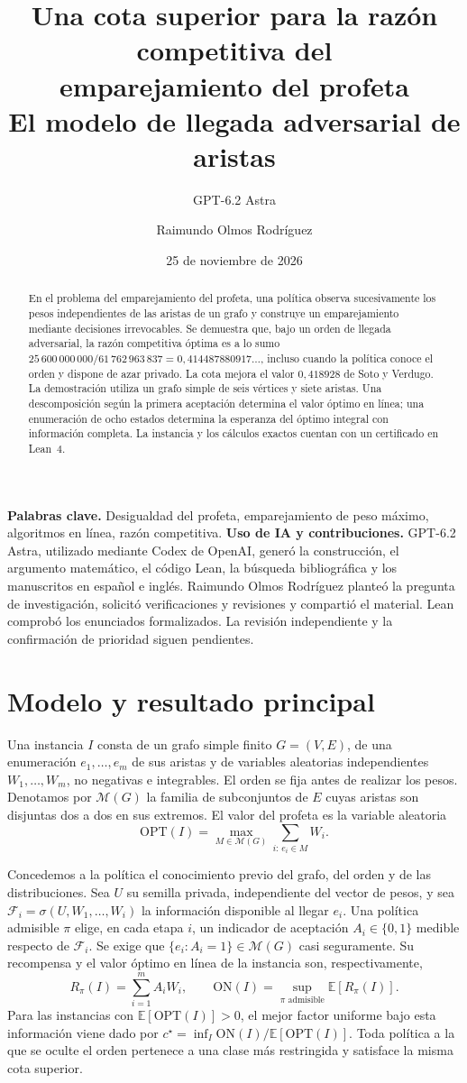 \documentclass[11pt,a4paper]{article}
\title{Una cota superior para la razón competitiva del\\
emparejamiento del profeta\\[.35em]
{\large El modelo de llegada adversarial de aristas}}
\author{GPT-6.2 Astra \and Raimundo Olmos Rodríguez}
\date{25 de noviembre de 2026}
\newcommand{\E}{\mathbb{E}}
\newcommand{\OPT}{\mathrm{OPT}}
\newcommand{\numon}{25\,600\,000\,000}
\newcommand{\numoff}{61\,762\,963\,837}
\newcommand{\ON}{\mathrm{ON}}
\newcommand{\F}{\mathcal F}
\begin{document}
\maketitle
\begin{abstract}
En el problema del emparejamiento del profeta, una política observa sucesivamente los pesos independientes de las aristas de un grafo y construye un emparejamiento mediante decisiones irrevocables. Se demuestra que, bajo un orden de llegada adversarial, la razón competitiva óptima es a lo sumo \(\numon/\numoff=0{,}414487880917\ldots\), incluso cuando la política conoce el orden y dispone de azar privado. La cota mejora el valor \(0{,}418928\) de Soto y Verdugo. La demostración utiliza un grafo simple de seis vértices y siete aristas. Una descomposición según la primera aceptación determina el valor óptimo en línea; una enumeración de ocho estados determina la esperanza del óptimo integral con información completa. La instancia y los cálculos exactos cuentan con un certificado en Lean~4.
\end{abstract}
\noindent\textbf{Palabras clave.} Desigualdad del profeta, emparejamiento de peso máximo, algoritmos en línea, razón competitiva.
\medskip\noindent\textbf{Uso de IA y contribuciones.} GPT-6.2 Astra, utilizado mediante Codex de OpenAI, generó la construcción, el argumento matemático, el código Lean, la búsqueda bibliográfica y los manuscritos en español e inglés. Raimundo Olmos Rodríguez planteó la pregunta de investigación, solicitó verificaciones y revisiones y compartió el material. Lean comprobó los enunciados formalizados. La revisión independiente y la confirmación de prioridad siguen pendientes.
\tableofcontents
\clearpage
\section{Modelo y resultado principal}\label{sec:modelo}
Una instancia \(I\) consta de un grafo simple finito \(G=(V,E)\), de una enumeración \(e_1,\ldots,e_m\) de sus aristas y de variables aleatorias independientes \(W_1,\ldots,W_m\), no negativas e integrables. El orden se fija antes de realizar los pesos. Denotamos por \(\mathcal M(G)\) la familia de subconjuntos de \(E\) cuyas aristas son disjuntas dos a dos en sus extremos. El valor del profeta es la variable aleatoria
\[
  \OPT(I)=\max_{M\in\mathcal M(G)}\sum_{i:\,e_i\in M} W_i .
\]

Concedemos a la política el conocimiento previo del grafo, del orden y de las distribuciones. Sea \(U\) su semilla privada, independiente del vector de pesos, y sea \(\F_i=\sigma(U,W_1,\ldots,W_i)\) la información disponible al llegar \(e_i\). Una política admisible \(\pi\) elige, en cada etapa \(i\), un indicador de aceptación \(A_i\in\{0,1\}\) medible respecto de \(\F_i\). Se exige que \(\{e_i:A_i=1\}\in\mathcal M(G)\) casi seguramente. Su recompensa y el valor óptimo en línea de la instancia son, respectivamente,
\[
 R_\pi(I)=\sum_{i=1}^m A_iW_i,\qquad
 \ON(I)=\sup_{\pi\text{ admisible}}\E[R_\pi(I)].
\]
Para las instancias con \(\E[\OPT(I)]>0\), el mejor factor uniforme bajo esta información viene dado por \(c^\star=\inf_I \ON(I)/\E[\OPT(I)]\). Toda política a la que se oculte el orden pertenece a una clase más restringida y satisface la misma cota superior.
\end{document}
